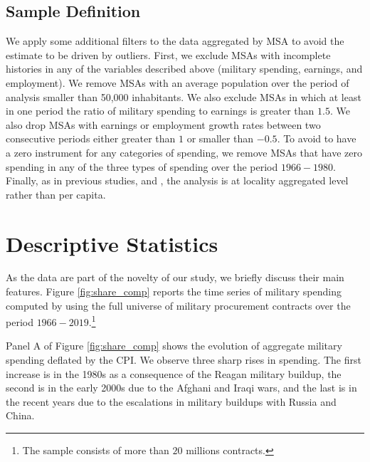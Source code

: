 \documentclass[dv_diss_main.tex]{subfiles}
\begin{document}
\subsection{Sample Definition}
\label{subsec:data_sam}


We apply some additional filters to the data aggregated by MSA to avoid the estimate to be driven by outliers. First, we exclude MSAs with incomplete histories in any of the variables described above (military spending, earnings, and employment). We remove MSAs with an average population over the period of analysis smaller than 50,000 inhabitants. We also exclude MSAs in which at least in one period the ratio of military spending to earnings is greater than $1.5$. We also drop MSAs with earnings or employment growth rates between two consecutive periods either greater than $1$ or smaller than $-0.5$. To avoid to have a zero instrument for any categories of spending, we remove MSAs that have zero spending in any of the three types of spending over the period $1966-1980$. Finally, as in previous studies, \cite{Auerbach2020} and \cite{Demyanyk2019}, the analysis is at locality aggregated level rather than per capita.










\section{Descriptive Statistics}
\label{sec:des_stats}


As the data are part of the novelty of our study, we briefly discuss their main features. Figure \ref{fig:share_comp} reports the time series of military spending computed by using the full universe of military procurement contracts over the period $1966-2019$.\footnote{The sample consists of more than $20$ millions contracts.} 

Panel A of Figure \ref{fig:share_comp} shows the evolution of aggregate military spending deflated by the CPI. We observe three sharp rises in spending. The first increase is in the 1980s as a consequence of the Reagan military buildup, the second is in the early 2000s due to the Afghani and Iraqi wars, and the last is in the recent years due to the escalations in military buildups with Russia and China.
\end{document}
